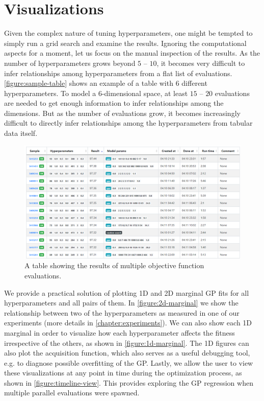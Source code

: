 \section{Visualizations}
\label{section:visualizations}

Given the complex nature of tuning hyperparameters, one might be tempted to simply run a grid search and examine the results. Ignoring the computational aspects for a moment, let us focus on the manual inspection of the results. As the number of hyperparameters grows beyond $5$ -- $10$, it becomes very difficult to infer relationships among hyperparameters from a flat list of evaluations. \autoref{figure:sample-table} shows an example of a table with $6$ different hyperparameters. To model a $6$-dimensional space, at least $15$ -- $20$ evaluations are needed to get enough information to infer relationships among the dimensions. But as the number of evaluations grow, it becomes increasingly difficult to directly infer relationships among the hyperparameters from tabular data itself.

\begin{figure}
	\begin{center}
		\includegraphics[width=1.0\textwidth]{images/sample-table.png}
		\caption{A table showing the results of multiple objective function evaluations.}
		\label{figure:sample-table}
	\end{center}
\end{figure}

We provide a practical solution of plotting 1D and 2D marginal GP fits for all hyperparameters and all pairs of them. In \autoref{figure:2d-marginal} we show the relationship between two of the hyperparameters as measured in one of our experiments (more details in \autoref{chapter:experiments}). We can also show each 1D marginal in order to visualize how each hyperparameter affects the fitness irrespective of the others, as shown in \autoref{figure:1d-marginal}. The 1D figures can also plot the acquisition function, which also serves as a useful debugging tool, e.g. to diagnose possible overfitting of the GP. Lastly, we allow the user to view these visualizations at any point in time during the optimization process, as shown in \autoref{figure:timeline-view}. This provides exploring the GP regression when multiple parallel evaluations were spawned.

